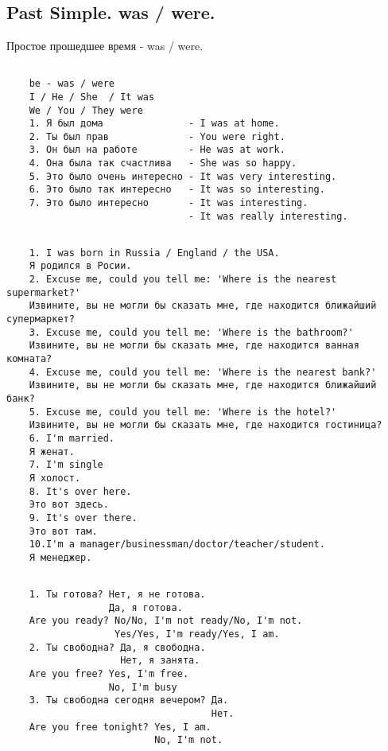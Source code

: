 \subsection{Past Simple. was / were.}
Простое прошедшее время - was / were.
\subsection*{}
\begin{verbatim}
    be - was / were
    I / He / She  / It was
    We / You / They were
    1. Я был дома               - I was at home.
    2. Ты был прав              - You were right.
    3. Он был на работе         - He was at work.
    4. Она была так счастлива   - She was so happy.
    5. Это было очень интересно - It was very interesting.
    6. Это было так интересно   - It was so interesting.
    7. Это было интересно       - It was interesting.
                                - It was really interesting.
\end{verbatim}

\subsection*{}
\begin{verbatim}
    1. I was born in Russia / England / the USA.
    Я родился в Росии.
    2. Excuse me, could you tell me: 'Where is the nearest supermarket?'
    Извините, вы не могли бы сказать мне, где находится ближайший супермаркет?
    3. Excuse me, could you tell me: 'Where is the bathroom?'
    Извините, вы не могли бы сказать мне, где находится ванная комната?
    4. Excuse me, could you tell me: 'Where is the nearest bank?'
    Извините, вы не могли бы сказать мне, где находится ближайший банк?
    5. Excuse me, could you tell me: 'Where is the hotel?'
    Извините, вы не могли бы сказать мне, где находится гостиница?
    6. I'm married.
    Я женат.
    7. I'm single
    Я холост.
    8. It's over here.
    Это вот здесь.
    9. It's over there.
    Это вот там.
    10.I'm a manager/businessman/doctor/teacher/student.
    Я менеджер.
\end{verbatim}

\subsection*{}
\begin{verbatim}
    1. Ты готова? Нет, я не готова.
                  Да, я готова.
    Are you ready? No/No, I'm not ready/No, I'm not.
                   Yes/Yes, I'm ready/Yes, I am.
    2. Ты свободна? Да, я свободна.
                    Нет, я занята.
    Are you free? Yes, I'm free.
                  No, I'm busy
    3. Ты свободна сегодня вечером? Да.
                                    Нет.
    Are you free tonight? Yes, I am.
                          No, I'm not.
\end{verbatim}

